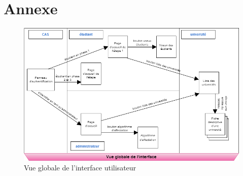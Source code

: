 \chapter*{Annexe}

\begin{figure}[H]
	\centering
	\includegraphics[angle=90,scale=0.7]{Annexe/vue_globale.png}
	\caption{Vue globale de l'interface utilisateur}
	\label{fig::vue_glob}
\end{figure}